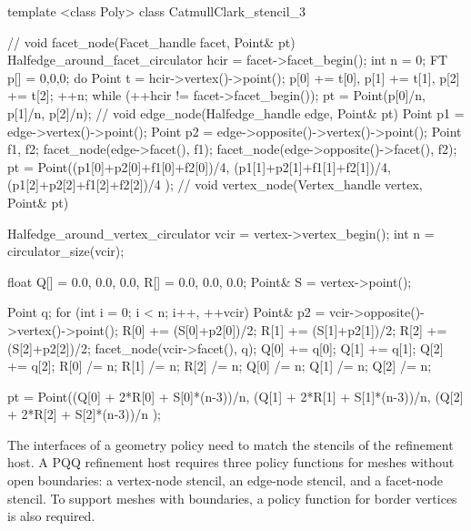 \begin{ccExampleCode}
template <class Poly>
class CatmullClark_stencil_3 {
  //
  void facet_node(Facet_handle facet, Point& pt) {
    Halfedge_around_facet_circulator hcir = facet->facet_begin();
    int n = 0;
    FT p[] = {0,0,0};
    do {
      Point t = hcir->vertex()->point();
      p[0] += t[0], p[1] += t[1], p[2] += t[2]; 
      ++n;
    } while (++hcir != facet->facet_begin());
    pt = Point(p[0]/n, p[1]/n, p[2]/n);
  }
  //
  void edge_node(Halfedge_handle edge, Point& pt) {
    Point p1 = edge->vertex()->point();
    Point p2 = edge->opposite()->vertex()->point();
    Point f1, f2;
    facet_node(edge->facet(), f1);
    facet_node(edge->opposite()->facet(), f2);
    pt = Point((p1[0]+p2[0]+f1[0]+f2[0])/4,
               (p1[1]+p2[1]+f1[1]+f2[1])/4,
               (p1[2]+p2[2]+f1[2]+f2[2])/4 );
  }
  //
  void vertex_node(Vertex_handle vertex, Point& pt) {
    Halfedge_around_vertex_circulator vcir = vertex->vertex_begin();
    int n = circulator_size(vcir);    

    float Q[] = {0.0, 0.0, 0.0}, R[] = {0.0, 0.0, 0.0};
    Point& S = vertex->point();
    
    Point q;
    for (int i = 0; i < n; i++, ++vcir) {
      Point& p2 = vcir->opposite()->vertex()->point();
      R[0] += (S[0]+p2[0])/2;
      R[1] += (S[1]+p2[1])/2;
      R[2] += (S[2]+p2[2])/2;
      facet_node(vcir->facet(), q);
      Q[0] += q[0];      
      Q[1] += q[1];      
      Q[2] += q[2];
    }
    R[0] /= n;    R[1] /= n;    R[2] /= n;
    Q[0] /= n;    Q[1] /= n;    Q[2] /= n;
      
    pt = Point((Q[0] + 2*R[0] + S[0]*(n-3))/n,
               (Q[1] + 2*R[1] + S[1]*(n-3))/n,
               (Q[2] + 2*R[2] + S[2]*(n-3))/n );
  }
}
\end{ccExampleCode}

The interfaces of a geometry policy need to match the stencils of 
the refinement host. A PQQ refinement host requires three 
policy functions for meshes without open boundaries: a vertex-node 
stencil, an edge-node stencil, and a facet-node stencil. 
To support meshes with boundaries, a policy function
for border vertices is also required.


